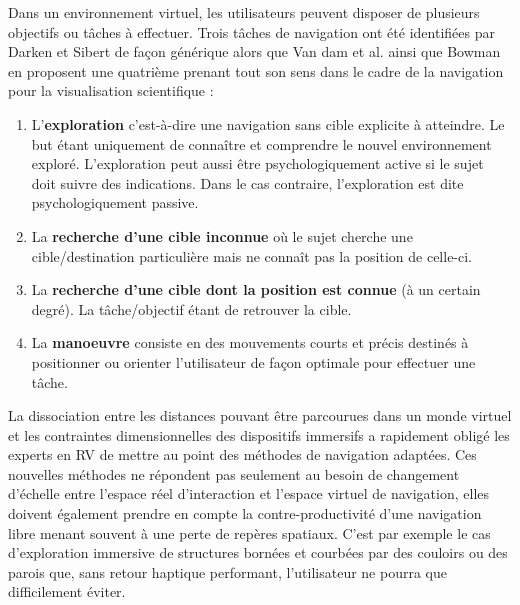 Dans un environnement virtuel, les utilisateurs peuvent disposer de plusieurs objectifs ou tâches à effectuer. Trois tâches de navigation ont été identifiées par Darken et Sibert \cite{darken1996navigating} de façon générique alors que Van dam et al. \cite{van_dam_immersive_2000} ainsi que Bowman \cite{bowman_doug_a_3d_2002} en proposent une quatrième prenant tout son sens dans le cadre de la navigation pour la visualisation scientifique :

\begin{enumerate}
  \item  L'\textbf{exploration} c’est-à-dire une navigation sans cible explicite à atteindre. Le but étant uniquement de connaître et comprendre le nouvel environnement exploré. L’exploration peut aussi être psychologiquement active si le sujet doit suivre des indications. Dans le cas contraire, l’exploration est dite psychologiquement passive.
  \item La \textbf{recherche d'une cible inconnue} où le sujet cherche une cible/destination particulière mais ne connaît pas la position de celle-ci.
  \item La \textbf{recherche d'une cible dont la position est connue} (à un certain degré). La tâche/objectif étant de retrouver la cible.
  \item La \textbf{manoeuvre} consiste en des mouvements courts et précis destinés à positionner ou orienter l'utilisateur de façon optimale pour effectuer une tâche.
\end{enumerate}


La dissociation entre les distances pouvant être parcourues dans un monde virtuel et les contraintes dimensionnelles des dispositifs immersifs a rapidement obligé les experts en RV de mettre au point des méthodes de navigation adaptées. Ces nouvelles méthodes ne répondent pas seulement au besoin de changement d'échelle entre l'espace réel d'interaction et l'espace virtuel de navigation, elles doivent également prendre en compte la contre-productivité d'une navigation libre menant souvent à une perte de repères spatiaux. C'est par exemple le cas d'exploration immersive de structures bornées et courbées par des couloirs ou des parois que, sans retour haptique performant, l'utilisateur ne pourra que difficilement éviter. 

